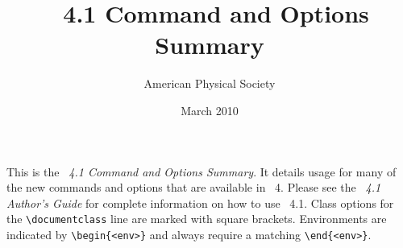 \documentclass[%
twocolumn,secnumarabic,amssymb, amsmath, nofootinbib,tightenlines,
nobibnotes, aps, 
prl,
]{revtex4-1}
\begin{document}
\title[Command Option Summary]{\revtex~4.1 Command and Options Summary}%

\author{American Physical Society}%
\date{March 2010}%
\maketitle

This is the \textit{\revtex~4.1 Command and Options Summary}. It details
usage for many of the new commands and options that are available in
\revtex~4. Please see the \textit{\revtex~4.1 Author's Guide} for
complete information on how to use \revtex~4.1.  Class options for the
\verb+\documentclass+ line are marked with square
brackets. Environments are indicated by \verb+\begin{<env>}+ and always
require a matching \verb+\end{<env>}+.
\end{document}
